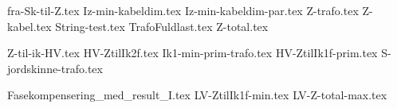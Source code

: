\usepackage[utf8]{inputenc}%
\usepackage{amsmath}%
\usepackage{mathtools}%
\usepackage{icomma}%
\usepackage{siunitx}%
\usepackage{fp}%
\usepackage{xstring}%
\usepackage{listofitems}
\usepackage{ifthen}
\usepackage{gensymb} %

{fra-Sk-til-Z.tex}
{Iz-min-kabeldim.tex}
{Iz-min-kabeldim-par.tex}
{Z-trafo.tex}
{Z-kabel.tex}
{String-test.tex}
{TrafoFuldlast.tex}
{Z-total.tex}

{Z-til-ik-HV.tex}
{HV-ZtilIk2f.tex}
{Ik1-min-prim-trafo.tex}
{HV-ZtilIk1f-prim.tex}
{S-jordskinne-trafo.tex}

{Fasekompensering_med_result_I.tex}
{LV-ZtilIk1f-min.tex}
{LV-Z-total-max.tex}